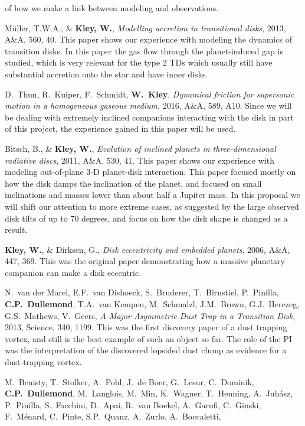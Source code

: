 \documentclass[10pt,fleqn,twoside,a4paper]{article}
\begin{document}
\begin{literature}
  of how we make a link between modeling and observations.
\item M\"uller, T.W.A., \& {\bf Kley, W.}, {\em Modelling accretion in
    transitional disks}, 2013, A\&A, 560, 40.  This paper shows our
  experience with modeling the dynamics of transition disks. In this paper
  the gas flow through the planet-induced gap is studied, which is very
  relevant for the type 2 TDs which usually still have substantial accretion
  onto the star and have inner disks. 
\item D.~Thun, R.~Kuiper, F.~Schmidt, {\bf W.~Kley}, {\em Dynamical friction
    for supersonic motion in a homogeneous gaseous medium}, 2016, A\&A, 589,
  A10. Since we will be dealing with extremely inclined companions
  interacting with the disk in part of this project, the experience gained
  in this paper will be used.
\item Bitsch, B., \& {\bf Kley, W.}, {\em Evolution of inclined planets in
    three-dimensional radiative discs}, 2011, A\&A, 530, 41. This paper
  shows our experience with modeling out-of-plane 3-D planet-disk
  interaction. This paper focused mostly on how the disk damps the
  inclination of the planet, and focused on small inclinations and masses
  lower than about half a Jupiter mass. In this proposal we will shift our
  attention to more extreme cases, as suggested by the large observed disk
  tilts of up to 70 degrees, and focus on how the disk shape is changed as
  a result. 
\item {\bf Kley, W.}, \& Dirksen, G., {\em Disk eccentricity and embedded
    planets}, 2006, A\&A, 447, 369. This was the original paper
  demonstrating how a massive planetary companion can make a disk eccentric.
\item N.~van der Marel, E.F.~van Dishoeck, S.~Bruderer, T.~Birnstiel,
  P.~Pinilla, {\bf C.P.~Dullemond}, T.A.~van Kempen, M.~Schmalzl,
  J.M.~Brown, G.J.~Herczeg, G.S.~Mathews, V.~Geers, {\em A Major Asymmetric
    Dust Trap in a Transition Disk}, 2013, Science, 340, 1199. This was the
  first discovery paper of a dust trapping vortex, and still is the best
  example of such an object so far. The role of the PI was the
  interpretation of the discovered lopsided dust clump as evidence for a
  dust-trapping vortex.
\item M.~Benisty, T.~Stolker, A.~Pohl, J.~de Boer, G.~Lesur, C.~Dominik,
  {\bf C.P.~Dullemond}, M.~Langlois, M.~Min, K.~Wagner, T.~Henning,
  A.~Juh{\'a}sz, P.~Pinilla, S.~Facchini, D.~Apai, R.~van Boekel, A.~Garufi,
  C.~Ginski, F.~M{\'e}nard, C.~Pinte, S.P.~Quanz, A.~Zurlo, A.~Boccaletti,

\end{literature}
\end{document}
